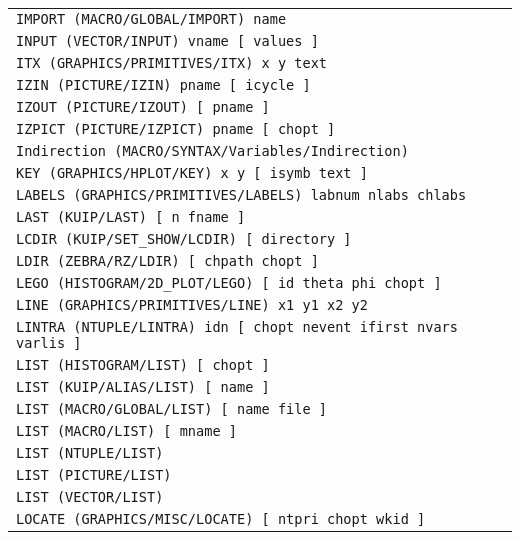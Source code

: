 \begin{longtable}{|>{\footnotesize\tt}lr|}
IMPORT (MACRO/GLOBAL/IMPORT)  name & \pageref{ref:MACRO/GLOBAL/IMPORT}\\ 
INPUT (VECTOR/INPUT)  vname [ values ] & \pageref{ref:VECTOR/INPUT}\\ 
ITX (GRAPHICS/PRIMITIVES/ITX)  x y text & \pageref{ref:GRAPHICS/PRIMITIVES/ITX}\\ 
IZIN (PICTURE/IZIN)  pname [ icycle ] & \pageref{ref:PICTURE/IZIN}\\ 
IZOUT (PICTURE/IZOUT)  [ pname ] & \pageref{ref:PICTURE/IZOUT}\\ 
IZPICT (PICTURE/IZPICT)  pname [ chopt ] & \pageref{ref:PICTURE/IZPICT}\\ 
Indirection (MACRO/SYNTAX/Variables/Indirection)  & \pageref{ref:MACRO/SYNTAX/Variables/Indirection}\\ 
KEY (GRAPHICS/HPLOT/KEY)  x y [ isymb text ] & \pageref{ref:GRAPHICS/HPLOT/KEY}\\ 
LABELS (GRAPHICS/PRIMITIVES/LABELS)  labnum nlabs chlabs & \pageref{ref:GRAPHICS/PRIMITIVES/LABELS}\\ 
LAST (KUIP/LAST)  [ n fname ] & \pageref{ref:KUIP/LAST}\\ 
LCDIR (KUIP/SET_SHOW/LCDIR)  [ directory ] & \pageref{ref:KUIP/SET_SHOW/LCDIR}\\ 
LDIR (ZEBRA/RZ/LDIR)  [ chpath chopt ] & \pageref{ref:ZEBRA/RZ/LDIR}\\ 
LEGO (HISTOGRAM/2D_PLOT/LEGO)  [ id theta phi chopt ] & \pageref{ref:HISTOGRAM/2D_PLOT/LEGO}\\ 
LINE (GRAPHICS/PRIMITIVES/LINE)  x1 y1 x2 y2 & \pageref{ref:GRAPHICS/PRIMITIVES/LINE}\\ 
LINTRA (NTUPLE/LINTRA)  idn [ chopt nevent ifirst nvars varlis ] & \pageref{ref:NTUPLE/LINTRA}\\ 
LIST (HISTOGRAM/LIST)  [ chopt ] & \pageref{ref:HISTOGRAM/LIST}\\ 
LIST (KUIP/ALIAS/LIST)  [ name ] & \pageref{ref:KUIP/ALIAS/LIST}\\ 
LIST (MACRO/GLOBAL/LIST)  [ name file ] & \pageref{ref:MACRO/GLOBAL/LIST}\\ 
LIST (MACRO/LIST)  [ mname ] & \pageref{ref:MACRO/LIST}\\ 
LIST (NTUPLE/LIST)  & \pageref{ref:NTUPLE/LIST}\\ 
LIST (PICTURE/LIST)  & \pageref{ref:PICTURE/LIST}\\ 
LIST (VECTOR/LIST)  & \pageref{ref:VECTOR/LIST}\\ 
LOCATE (GRAPHICS/MISC/LOCATE)  [ ntpri chopt wkid ] & \pageref{ref:GRAPHICS/MISC/LOCATE}\\ 

\end{longtable}
